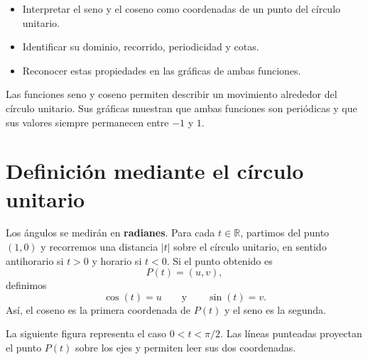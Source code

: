 \documentclass[10pt,a5paper]{article}
\begin{document}

\begin{objetivos}
\begin{itemize}
  \item Interpretar el seno y el coseno como coordenadas de un punto del círculo unitario.
  \item Identificar su dominio, recorrido, periodicidad y cotas.
  \item Reconocer estas propiedades en las gráficas de ambas funciones.
\end{itemize}
\end{objetivos}

\begin{resumen}
Las funciones seno y coseno permiten describir un movimiento alrededor del círculo unitario. Sus gráficas muestran que ambas funciones son periódicas y que sus valores siempre permanecen entre $-1$ y $1$.
\end{resumen}

\section*{Definición mediante el círculo unitario}

Los ángulos se medirán en \textbf{radianes}. Para cada $t\in\mathbb{R}$, partimos del punto $(1,0)$ y recorremos una distancia $|t|$ sobre el círculo unitario, en sentido antihorario si $t>0$ y horario si $t<0$. Si el punto obtenido es
\[
  P(t)=(u,v),
\]
definimos
\[
  \cos(t)=u
  \qquad\text{y}\qquad
  \sin(t)=v.
\]
Así, el coseno es la primera coordenada de $P(t)$ y el seno es la segunda.

La siguiente figura representa el caso $0<t<\pi/2$. Las líneas punteadas proyectan el punto $P(t)$ sobre los ejes y permiten leer sus dos coordenadas.
\begin{center}
\end{center}
\end{document}
